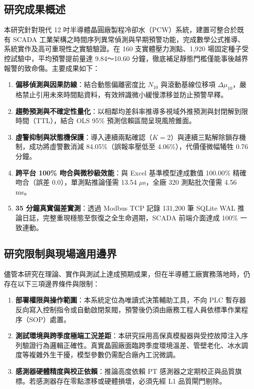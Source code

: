 \documentclass[fontset=none, a4paper, 12pt]{ctexart}
\begin{document}
\subsection{研究成果概述}
本研究針對現代 12 吋半導體晶圓廠製程冷卻水（PCW）系統，建置可整合於既有 SCADA 工業架構之時間序列異常偵測與早期預警功能，完成數學公式推導、系統實作及高可重現性之實驗驗證。在 160 支實體壓力測點、1,920 場固定種子受控試驗中，平均預警提前量達 9.84～10.60 分鐘，徹底補足靜態門檻僅能事後越界報警的致命傷。主要成果如下：
\begin{enumerate}
    \item \textbf{偏移偵測與因果防線}：結合動態偏離密度比 $N_{10}$ 與滾動基線位移項 $\Delta\mu_{10}$，嚴格禁止引用未來時間點資料，有效辨識微小緩慢漂移並防止預警早釋。
    \item \textbf{趨勢預測與不確定性量化}：以相鄰均差斜率推導多視域外推預測與封閉解到限時間（TTL），結合 OLS 95\% 預測信賴區間呈現風險錐面。
    \item \textbf{虛警抑制與狀態機保護}：導入連續兩點確認（$K=2$）與連續三點解除鎖存機制，成功將虛警數消減 84.05\%（誤報率壓低至 4.06\%），代價僅微幅犧牲 0.76 分鐘。
    \item \textbf{跨平台 100\% 吻合與微秒級效能}：與 Excel 基準模型達成數值 100.00\% 精確吻合（誤差 0.0），單測點推論僅需 13.54 $\mu$s，全廠 320 測點批次僅需 4.56 ms。
    \item \textbf{35 分鐘真實偏差實測}：透過 Modbus TCP 記錄 131,200 筆 SQLite WAL 推論日誌，完整重現穩態至恢復之全生命週期，SCADA 前端介面達成 100\% 一致連動。
\end{enumerate}

\subsection{研究限制與現場適用邊界}
儘管本研究在理論、實作與測試上達成預期成果，但在半導體工廠實務落地時，仍存在以下三項邊界條件與限制：
\begin{enumerate}
    \item \textbf{部署權限與操作範圍}：本系統定位為唯讀式決策輔助工具，不向 PLC 暫存器反向寫入控制指令或自動啟閉泵閥，預警後仍須由廠務工程人員依標準作業程序（SOP）處置。
    \item \textbf{測試環境與跨季度極端工況差距}：本研究採用高保真模擬器與受控故障注入序列驗證行為邏輯正確性。真實晶圓廠面臨跨季度環境溫差、管壁老化、冰水調度等複雜外生干擾，模型參數仍需配合廠內工況微調。
    \item \textbf{感測器硬體精度與校正依賴}：推論高度依賴 PT 感測器之定期校正與品質旗標。若感測器存在零點漂移或硬體損壞，必須先經 L1 品質閘門剔除。
\end{enumerate}
\end{document}
